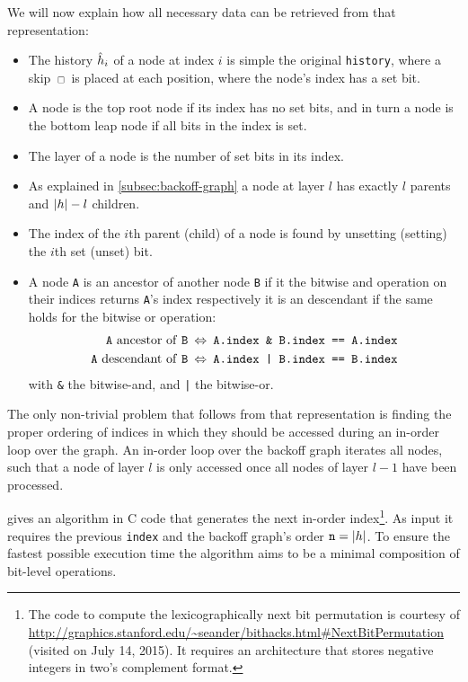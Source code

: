 We will now explain how all necessary data can be retrieved from that
representation:
\begin{itemize}
  \item The history $\DerivedHistory[i]$ of a node at index $i$ is simple
    the original \texttt{history}, where a skip $\Skp$ is placed at each
    position, where the node's index has a set bit.
  \item A node is the top root node if its index has no set bits, and in turn a
    node is the bottom leap node if all bits in the index is set.
  \item The layer of a node is the number of set bits in its index.
  \item As explained in \cref{subsec:backoff-graph} a node at layer $l$ has
    exactly $l$ parents and ${\left|h\right|} - l$ children.
  \item The index of the $i$th parent (child) of a node is found by unsetting
    (setting) the $i$th set (unset) bit.
  \clearpage
  \item A node \texttt{A} is an ancestor of another node \texttt{B}
    if it the bitwise and operation on their indices returns \texttt{A}'s index
    respectively it is an descendant if the same holds for the bitwise or
    operation:
    \begin{align*}
      \text{\texttt{A} ancestor of \texttt{B}} \: &\Leftrightarrow \: \texttt{A.index \& B.index == A.index} \\
      \text{\texttt{A} descendant of \texttt{B}} \: &\Leftrightarrow \: \texttt{A.index | B.index == B.index}
    \end{align*}
    with \texttt{\&} the bitwise-and, and \texttt{|} the bitwise-or.
\end{itemize}

The only non-trivial problem that follows from that representation is finding
the proper ordering of indices in which they should be accessed during an
in-order loop over the graph.
An in-order loop over the backoff graph iterates all nodes, such that a node
of layer $l$ is only accessed once all nodes of layer $l-1$ have been processed.

 gives an algorithm in C code that generates the
next in-order index\footnote{The code to compute the lexicographically next bit
permutation is courtesy of
\mbox{\url{http://graphics.stanford.edu/~seander/bithacks.html\#NextBitPermutation}}
(visited on July 14, 2015).
It requires an architecture that stores negative integers in two's complement
format.}.
As input it requires the previous \texttt{index} and the backoff graph's order
$\texttt{n} = {\left|h\right|}$.
To ensure the fastest possible execution time the algorithm aims to be a minimal
composition of bit-level operations.

